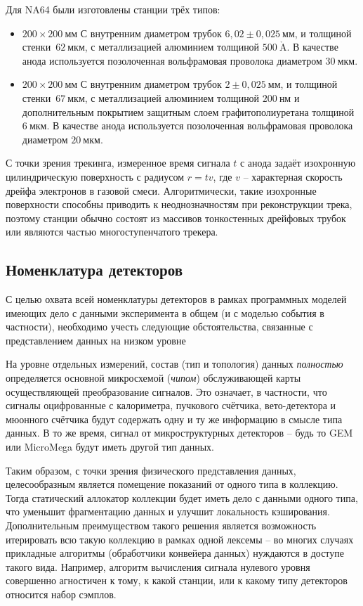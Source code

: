 Для NA64 были изготовлены станции трёх типов:
\begin{itemize}
    \item $200\times200~\text{мм}$ С внутренним диаметром
    трубок $6{,}02 \pm 0{,}025~\text{мм}$, и толщиной
    стенки~$62~\text{мкм}$, с металлизацией алюминием толщиной $500~\mathring{\text{A}}$.
    В качестве анода используется позолоченная вольфрамовая проволока диаметром $30~\text{мкм}$.
    \item $200\times200~\text{мм}$ С внутренним диаметром
    трубок $2 \pm 0{,}025~\text{мм}$, и толщиной
    стенки~$67~\text{мкм}$, с металлизацией алюминием толщиной $200~\text{нм}$
    и дополнительным покрытием защитным слоем графитополиуретана толщиной~$6~\text{мкм}$.
    В качестве анода используется позолоченная вольфрамовая проволока диаметром
    $20~\text{мкм}$.
\end{itemize}

С точки зрения трекинга, измеренное время сигнала $t$ с анода задаёт
изохронную цилиндрическую поверхность с радиусом $r = t v$, где
$v$ -- характерная скорость дрейфа электронов в газовой смеси.
Алгоритмически, такие изохронные поверхности способны приводить к
неоднозначностям при реконструкции трека, поэтому станции обычно состоят
из массивов тонкостенных дрейфовых трубок или являются частью
многоступенчатого трекера.

\subsection{Номенклатура детекторов}

С целью охвата всей номенклатуры детекторов в рамках программных
моделей имеющих дело с данными эксперимента в общем (и с моделью
события в частности), необходимо учесть следующие обстоятельства,
связанные с представлением данных на низком уровне 

На уровне отдельных измерений, состав (тип и топология)
данных \emph{полностью} определяется основной микросхемой (\emph{чипом})
обслуживающей карты осуществляющей преобразование сигналов.
Это означает, в частности, что сигналы оцифрованные с калориметра,
пучкового счётчика, вето-детектора и мюонного счётчика будут
содержать одну и ту же информацию в смысле типа данных. В то же
время, сигнал от микроструктурных детекторов -- будь
то GEM или MicroMega будут иметь другой тип данных.

Таким образом, с точки зрения физического представления данных,
целесообразным является помещение показаний от одного типа в
коллекцию. Тогда статический аллокатор коллекции будет иметь дело
с данными одного типа, что уменьшит фрагментацию данных и
улучшит локальность кэширования. Дополнительным преимуществом
такого решения является возможность итерировать всю такую коллекцию
в рамках одной лексемы -- во многих случаях прикладные алгоритмы
(обработчики конвейера данных) нуждаются в доступе такого вида.
Например, алгоритм вычисления сигнала нулевого уровня
совершенно агностичен к тому, к какой станции,
или к какому типу детекторов относится набор сэмплов.

